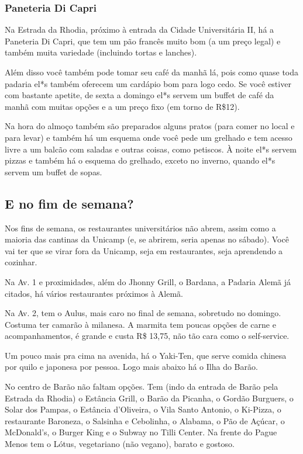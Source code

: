 \subsubsection{Paneteria Di Capri}

Na Estrada da Rhodia, próximo à entrada da Cidade Universitária II, há a
Paneteria Di Capri, que tem um pão francês muito bom (a um preço legal) e
também muita variedade (incluindo tortas e lanches).

Além disso você também pode tomar seu café da manhã lá, pois como quase toda
padaria el*s também oferecem um cardápio bom para logo cedo. Se você estiver
com bastante apetite, de sexta a domingo el*s servem um buffet de café da manhã
com muitas opções e a um preço fixo (em torno de R\$12).

Na hora do almoço também são preparados alguns pratos (para comer no local e
para levar) e também há um esquema onde você pede um grelhado e tem acesso
livre a um balcão com saladas e outras coisas, como petiscos. À noite el*s
servem pizzas e também há o esquema do grelhado, exceto no inverno, quando el*s
servem um buffet de sopas.

\subsection{E no fim de semana?}

Nos fins de semana, os restaurantes universitários não abrem, assim como a
maioria das cantinas da Unicamp (e, se abrirem, seria apenas no sábado). Você
vai ter que se virar fora da Unicamp, seja em restaurantes, seja aprendendo a
cozinhar.

Na Av. 1 e proximidades, além do Jhonny Grill, o Bardana, a Padaria Alemã já
citados, há vários restaurantes próximos à Alemã.

Na Av. 2, tem o Aulus, mais caro no final de semana, sobretudo no domingo.
Costuma ter camarão à milanesa. A marmita tem poucas opções de carne e
acompanhamentos, é grande e custa R\$ 13,75, não tão cara como o self-service.

Um pouco mais pra cima na avenida, há o Yaki-Ten, que serve comida chinesa por
quilo e japonesa por pessoa. Logo mais abaixo há o Ilha do Barão.

No centro de Barão não faltam opções. Tem (indo da entrada de Barão pela
Estrada da Rhodia) o Estância Grill, o Barão da Picanha, o Gordão Burguers, o
Solar dos Pampas, o Estância d'Oliveira, o Vila Santo Antonio, o Ki-Pizza, o
restaurante Baroneza, o Salsinha e Cebolinha, o Alabama, o Pão de Açúcar, o
McDonald's, o Burger King e o Subway no Tilli Center. Na frente do Pague Menos
tem o Lótus, vegetariano (não vegano), barato e gostoso.

